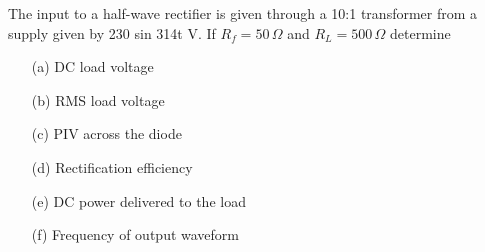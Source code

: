 \begin{example}\label{exam2.4}
The input to a half-wave rectifier is given through a 10:1 transformer
from a supply given by 230 sin 314t V. If $R_f = 50\,\Omega$ and $R_L =
500\,\Omega$ determine
\begin{itemize}
\itemsep=1pt
\item[(a)] DC load voltage
\item[(b)] RMS load voltage 
\item[(c)] PIV across the diode 
\item[(d)] Rectification efficiency
\item[(e)] DC power delivered to the load 
\item[(f)] Frequency of output waveform
\end{itemize}
\end{example}

